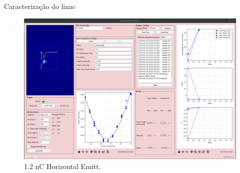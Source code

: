 \begin{frame}{Caracterização do linac}
\begin{figure}[ht]
\begin{minipage}[b]{0.4\linewidth}
        \includegraphics[width=\textwidth]{2024-07-12/figures/emitx_meas_bias_m30p4_charge_3p0nc.png}
        \caption{1.2 nC Horizontal Emitt.}
        \label{fig:b}
    \end{minipage}
\end{figure}
\end{frame}
